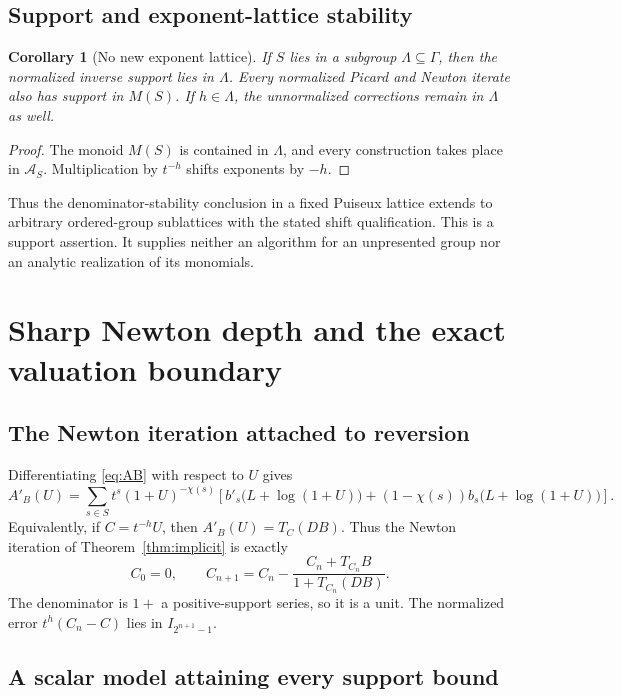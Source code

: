 \documentclass[11pt,a4paper]{article}
\newtheorem{corollary}[theorem]{Corollary}
\theoremstyle{definition}
\theoremstyle{remark}
\newcommand{\AS}{\mathscr A_S}
\begin{document}
\subsection{Support and exponent-lattice stability}

\begin{corollary}[No new exponent lattice]\label{cor:lattice}
If $S$ lies in a subgroup $\Lambda\subseteq\Gamma$, then the normalized
inverse support lies in $\Lambda$. Every normalized Picard and Newton
iterate also has support in $M(S)$. If $h\in\Lambda$, the unnormalized
corrections remain in $\Lambda$ as well.
\end{corollary}
\begin{proof}
The monoid $M(S)$ is contained in $\Lambda$, and every construction takes
place in $\AS$. Multiplication by $t^{-h}$ shifts exponents by $-h$.
\end{proof}

Thus the denominator-stability conclusion in a fixed Puiseux lattice
extends to arbitrary ordered-group sublattices with the stated shift
qualification. This is a support assertion. It supplies neither an
algorithm for an unpresented group nor an analytic realization of its
monomials.

\section{Sharp Newton depth and the exact valuation boundary}
\label{sec:sharp}

\subsection{The Newton iteration attached to reversion}
Differentiating \eqref{eq:AB} with respect to $U$ gives
\begin{equation}\label{eq:ABderiv}
 A'_B(U)=\sum_{s\in S}t^s(1+U)^{-\chi(s)}
 \left[b'_s\bigl(L+\log(1+U)\bigr)
 +(1-\chi(s))b_s\bigl(L+\log(1+U)\bigr)\right].
\end{equation}
Equivalently, if $C=t^{-h}U$, then $A'_B(U)=T_C(DB)$.
Thus the Newton iteration of Theorem~\ref{thm:implicit} is exactly
\begin{equation}\label{eq:NewtonC}
 C_0=0,\qquad
 C_{n+1}=C_n-\frac{C_n+T_{C_n}B}{1+T_{C_n}(DB)}.
\end{equation}
The denominator is $1+$ a positive-support series, so it is a unit.
The normalized error $t^h(C_n-C)$ lies in $I_{2^{n+1}-1}$.

\subsection{A scalar model attaining every support bound}
\end{document}
